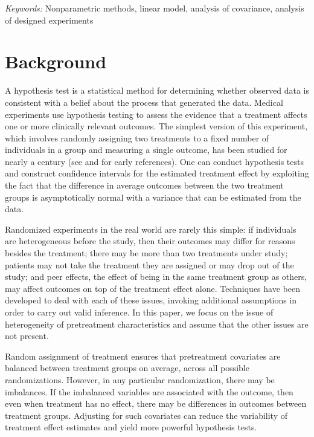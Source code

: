 \documentclass[12pt]{article}
\begin{document}
\noindent%
{\it Keywords:}  Nonparametric methods, linear model, analysis of covariance, analysis of designed experiments
\vfill

\newpage
{} %
\section{Background}
A hypothesis test is a statistical method for determining whether observed data is consistent with a belief about the process that generated the data.
Medical experiments use hypothesis testing to assess the evidence that a treatment affects one or more clinically relevant outcomes.
The simplest version of this experiment, which involves randomly assigning two treatments to a fixed number of individuals in a group and measuring a single outcome, has been studied for nearly a century (see \cite{fisher_design_1935} and \cite[1990 translation]{neyman_application_1923} for early references).
One can conduct hypothesis tests and construct confidence intervals for the estimated treatment effect
by exploiting the fact that the difference in average outcomes between the two treatment groups is asymptotically normal with a variance that can be estimated from the data.

Randomized experiments in the real world are rarely this simple:
if individuals are heterogeneous before the study, then their outcomes may differ for reasons besides the treatment;
there may be more than two treatments under study;
patients may not take the treatment they are assigned or may drop out of the study;
and peer effects, the effect of being in the same treatment group as others, may affect outcomes on top of the treatment effect alone.
Techniques have been developed to deal with each of these issues, invoking additional assumptions in order to carry out valid inference.
In this paper, we focus on the issue of heterogeneity of pretreatment characteristics and assume that the other issues are not present.

Random assignment of treatment ensures that pretreatment covariates are balanced between treatment groups on average, across all possible randomizations.
However, in any particular randomization, there may be imbalances.
If the imbalanced variables are associated with the outcome, then even when treatment has no effect, there may be differences in outcomes between treatment groups.
Adjusting for such covariates can reduce the variability of treatment effect estimates and yield more powerful hypothesis tests.
\end{document}
